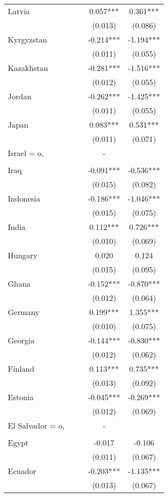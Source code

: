 \documentclass[]{article}
\begin{document}
\begin{tabular}{lcccc}
Latvia &  &  & 0.057*** & 0.361*** \\
 &  &  & (0.013) & (0.086) \\
Kyrgyzstan &  &  & -0.214*** & -1.194*** \\
 &  &  & (0.011) & (0.055) \\
Kazakhstan &  &  & -0.281*** & -1.516*** \\
 &  &  & (0.012) & (0.055) \\
Jordan &  &  & -0.262*** & -1.425*** \\
 &  &  & (0.011) & (0.055) \\
Japan &  &  & 0.083*** & 0.531*** \\
 &  &  & (0.011) & (0.071) \\
Israel = o, &  &  & - &  \\
 &  &  &  &  \\
Iraq &  &  & -0.091*** & -0.536*** \\
 &  &  & (0.015) & (0.082) \\
Indonesia &  &  & -0.186*** & -1.046*** \\
 &  &  & (0.015) & (0.075) \\
India &  &  & 0.112*** & 0.726*** \\
 &  &  & (0.010) & (0.069) \\
Hungary &  &  & 0.020 & 0.124 \\
 &  &  & (0.015) & (0.095) \\
Ghana &  &  & -0.152*** & -0.870*** \\
 &  &  & (0.012) & (0.064) \\
Germany &  &  & 0.199*** & 1.355*** \\
 &  &  & (0.010) & (0.075) \\
Georgia &  &  & -0.144*** & -0.830*** \\
 &  &  & (0.012) & (0.062) \\
Finland &  &  & 0.113*** & 0.735*** \\
 &  &  & (0.013) & (0.092) \\
Estonia &  &  & -0.045*** & -0.269*** \\
 &  &  & (0.012) & (0.069) \\
El Salvador = o, &  &  & - &  \\
 &  &  &  &  \\
Egypt &  &  & -0.017 & -0.106 \\
 &  &  & (0.011) & (0.067) \\
Ecuador &  &  & -0.203*** & -1.135*** \\
 &  &  & (0.013) & (0.067) \\

\end{tabular}
\end{document}
